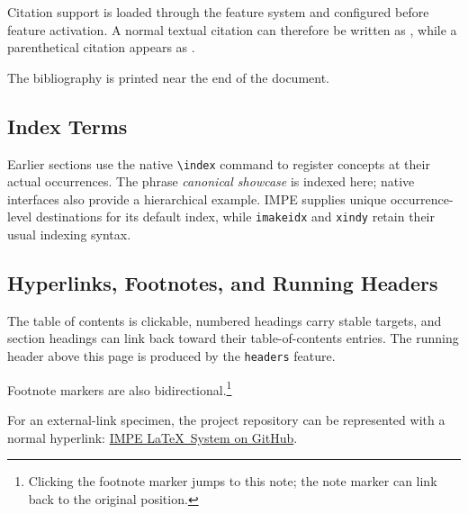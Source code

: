 \documentclass[11pt,twoside]{impeart}
\begin{document}
Citation support is loaded through the feature system and configured before
feature activation. A normal textual citation can therefore be written as
\textcite{knuth1984texbook}, while a parenthetical citation appears as
\parencite{knuth1984texbook}.

The bibliography is printed near the end of the document.

\subsection{Index Terms}

Earlier sections use the native \texttt{\textbackslash index} command to
register concepts at their actual occurrences. The phrase
\emph{canonical showcase} is indexed here;
native interfaces also provide a
hierarchical example. IMPE supplies unique occurrence-level destinations
for its default index, while \texttt{imakeidx} and \texttt{xindy} retain
their usual indexing syntax.

\subsection{Hyperlinks, Footnotes, and Running Headers}

The table of contents is clickable, numbered headings carry stable targets,
and section headings can link back toward their table-of-contents entries.
The running header above this page is produced by the \texttt{headers}
feature.

Footnote markers are also bidirectional.\footnote{Clicking the footnote marker
jumps to this note; the note marker can link back to the original position.}

For an external-link specimen, the project repository can be represented with
a normal hyperlink:
\href{https://github.com/KelvinYangBK67/IMPE-LaTeX-System}
{IMPE \LaTeX~System on GitHub}.


\printbibliography[
  heading=bibintoc,
  title={References}
]

\printindex
\end{document}
